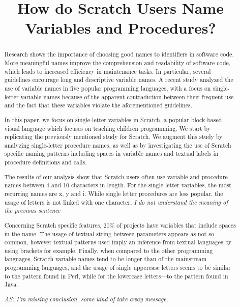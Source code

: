 \documentclass[conference]{IEEEtran}
\begin{document}
\title{How do Scratch Users Name Variables and Procedures? }

\author{
\and
{}
}
\maketitle

\begin{abstract}
Research shows the importance of choosing good names to identifiers in software code. More meaningful names improve the comprehension and readability of software code, which leads to increased efficiency in maintenance tasks. 
In particular, several guidelines encourage long and descriptive variable names.
A recent study analyzed the use of variable names in five popular programming languages, with a focus on single-letter variable names because of the apparent contradiction between their frequent use and the fact that these variables violate the aforementioned guidelines. 

In this paper, we focus on single-letter variables in Scratch, a popular block-based visual language which focuses on teaching children programming.
We start by replicating the previously mentioned study for Scratch. 
We augment this study by analyzing single-letter procedure names, as well as by investigating the use of Scratch specific naming patterns including spaces in variable names and textual labels in procedure definitions and calls.

The results of our analysis show that Scratch users often use variable and procedure names between 4 and 10 characters in length. For the single letter variables, the most recurring names are x, y and i. While single letter procedures are less popular, the usage of letters is not linked with one character. \emph{I do not understand the meaning of the previous sentence}

Concerning Scratch specific features, 20\% of projects have variables that include spaces in the name. The usage of textual string between parameters appears as not so common, however textual patterns used imply an inference from textual languages by using brackets for example. 
Finally, when compared to the other programming languages, Scratch variable names tend to be longer than of the mainstream programming languages, and the usage of single uppercase letters seems to be similar to the pattern found in Perl, while for the lowercase letters---to the pattern found in Java. 

\emph{AS: I'm missing conclusion, some kind of take away message.}
\end{abstract}
\end{document}
